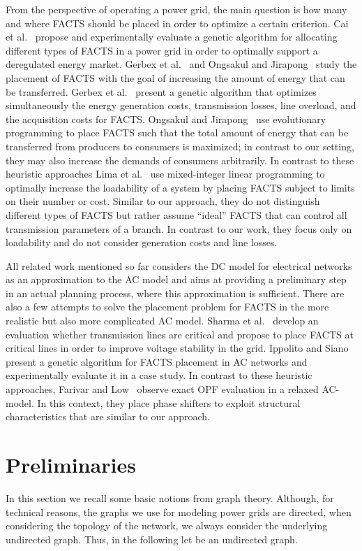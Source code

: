 \documentclass{article}[11pt,a4paper]
\begin{document}
From the perspective of operating a power grid, the main question is
how many and where FACTS should be placed in order to optimize a
certain criterion.  Cai et al.~\cite{1397562} propose and
experimentally evaluate a genetic algorithm for allocating different
types of FACTS in a power grid in order to optimally support a
deregulated energy market.  Gerbex et al.~\cite{gcg-olmtf-01} and
Ongsakul and Jirapong~\cite{1465551} study the placement of FACTS with
the goal of increasing the amount of energy that can be transferred.
Gerbex et al.~\cite{gcg-olmtf-01} present a genetic algorithm that
optimizes simultaneously the energy generation costs, transmission
losses, line overload, and the acquisition costs for FACTS.  Ongsakul
and Jirapong~\cite{1465551} use evolutionary programming to place
FACTS such that the total amount of energy that can be transferred
from producers to consumers is maximized; in contrast to our setting,
they may also increase the demands of consumers arbitrarily.
In contrast to these heuristic approaches Lima et
al.~\cite{lgkm-psp-03} use mixed-integer linear programming to
optimally increase the loadability of a system by placing FACTS
subject to limits on their number or cost.  Similar to our approach,
they do not distinguish different types of FACTS but rather assume
``ideal'' FACTS that can control all transmission parameters of a
branch.  In contrast to our work, they focus only on loadability and
do not consider generation costs and line losses.

All related work mentioned so far considers the DC model for
electrical networks as an approximation to the AC model and aims at
providing a preliminary step in an actual planning process, where this
approximation is sufficient.  There are also a few attempts to solve
the placement problem for FACTS in the more realistic but also more
complicated AC model.  
Sharma et al.~\cite{sgv-nps-03} develop an
evaluation whether transmission lines are critical and propose to
place FACTS at critical lines in order to improve voltage stability in
the grid.  Ippolito and Siano~\cite{is-sonl-04} present a genetic
algorithm for FACTS placement in AC networks and experimentally
evaluate it in a case study.
In contrast to these heuristic approaches, Farivar and Low~\cite{6507352} 
observe exact OPF evaluation in a relaxed AC-model. In this context, they 
place phase shifters to exploit structural characteristics that are similar to our approach.
\section{Preliminaries}
\label{sec:preliminaries}
In this section we recall some basic notions from graph theory.
Although, for technical reasons, the graphs we use for modeling power
grids are directed, when considering the topology of the network, we
always consider the underlying undirected graph.  Thus, in the
following let  be an undirected graph.
\end{document}

